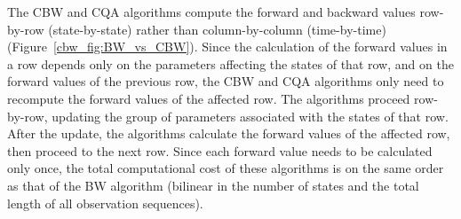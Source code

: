 \documentclass[preprint,12pt,authoryear]{elsarticle}
\begin{document}
The CBW and CQA algorithms compute the forward and backward values row-by-row (state-by-state) rather than column-by-column (time-by-time) (Figure~\ref{cbw_fig:BW_vs_CBW}).  Since the calculation of the forward values in a row depends only on the parameters affecting the states of that row, and on the forward values of the previous row, the CBW and CQA algorithms only need to recompute the forward values of the affected row.  The algorithms proceed row-by-row, updating the group of parameters associated with the states of that row.  After the update, the algorithms calculate the forward values of the affected row, then proceed to the next row.  Since each forward value needs to be calculated only once, the total computational cost of these algorithms is on the same order as that of the BW algorithm (bilinear in the number of states and the total length of all observation sequences).
\end{document}
